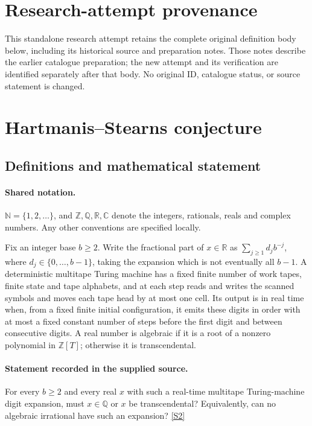 \documentclass[11pt]{article}
\begin{document}
\section*{Research-attempt provenance}
This standalone research attempt retains the complete original definition body below,
including its historical source and preparation notes. Those notes describe the
earlier catalogue preparation; the new attempt and its verification are identified
separately after that body. No original ID, catalogue status, or source statement is changed.

\section{Hartmanis–Stearns conjecture}\label{statement}

\subsection{Definitions and mathematical statement}

\paragraph{Shared notation.}$\mathbb N=\{1,2,\ldots\}$, and $\mathbb Z,\mathbb Q,\mathbb R,\mathbb C$ denote the integers, rationals, reals and complex numbers. Any other conventions are specified locally.


Fix an integer base $b\ge2$. Write the fractional part of $x\in\mathbb R$ as $\sum_{j\ge1}d_jb^{-j}$, where $d_j\in\{0,\ldots,b-1\}$, taking the expansion which is not eventually all $b-1$. A deterministic multitape Turing machine has a fixed finite number of work tapes, finite state and tape alphabets, and at each step reads and writes the scanned symbols and moves each tape head by at most one cell. Its output is in real time when, from a fixed finite initial configuration, it emits these digits in order with at most a fixed constant number of steps before the first digit and between consecutive digits. A real number is algebraic if it is a root of a nonzero polynomial in $\mathbb Z[T]$; otherwise it is transcendental.
\paragraph{Statement recorded in the supplied source.}
For every $b\ge2$ and every real $x$ with such a real-time multitape Turing-machine digit expansion, must $x\in\mathbb Q$ or $x$ be transcendental? Equivalently, can no algebraic irrational have such an expansion? \href{https://arxiv.org/pdf/1803.10267}{[S2]}
\end{document}
